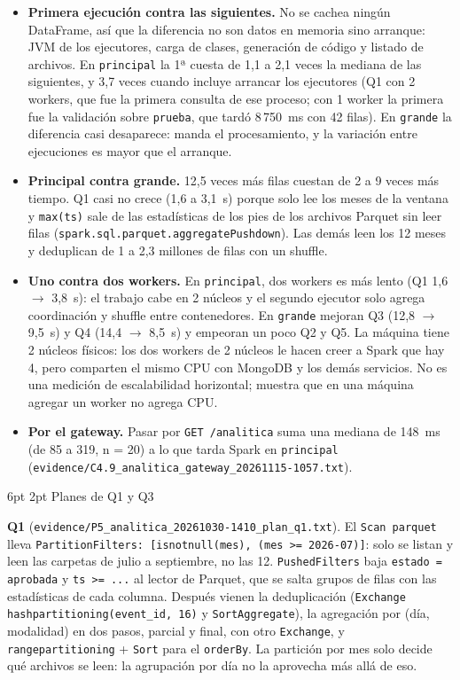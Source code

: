 \documentclass[10pt,letterpaper]{article}
\makeatletter
\newcommand{\ev}[1]{{\footnotesize\texttt{evidence/\allowbreak #1}}}
\renewcommand\subsection{\@startsection{subsection}{2}{\z@}%
  {6pt \@plus 1pt}{2pt}%
  {\normalfont\normalsize\bfseries\color{acc}}}
\makeatother
\begin{document}
\begin{itemize}\setlength{\itemsep}{1pt}
\item \textbf{Primera ejecución contra las siguientes.} No se cachea ningún DataFrame, así que la diferencia
no son datos en memoria sino arranque: JVM de los ejecutores, carga de clases, generación de código y listado
de archivos. En \texttt{principal} la 1ª cuesta de 1,1 a 2,1 veces la mediana de las siguientes, y 3,7 veces
cuando incluye arrancar los ejecutores (Q1 con 2 workers, que fue la primera consulta de ese proceso; con 1
worker la primera fue la validación sobre \texttt{prueba}, que tardó 8\,750~ms con 42 filas). En
\texttt{grande} la diferencia casi desaparece: manda el procesamiento, y la variación entre ejecuciones es
mayor que el arranque.
\item \textbf{Principal contra grande.} 12,5 veces más filas cuestan de 2 a 9 veces más tiempo. Q1 casi no
crece (1,6 a 3,1~s) porque solo lee los meses de la ventana y \texttt{max(ts)} sale de las estadísticas de
los pies de los archivos Parquet sin leer filas (\texttt{spark.sql.parquet.aggregatePushdown}). Las demás leen
los 12 meses y deduplican de 1 a 2,3 millones de filas con un shuffle.
\item \textbf{Uno contra dos workers.} En \texttt{principal}, dos workers es más lento (Q1 1,6 $\rightarrow$
3,8~s): el trabajo cabe en 2 núcleos y el segundo ejecutor solo agrega coordinación y shuffle entre
contenedores. En \texttt{grande} mejoran Q3 (12,8 $\rightarrow$ 9,5~s) y Q4 (14,4 $\rightarrow$ 8,5~s) y
empeoran un poco Q2 y Q5. La máquina tiene 2 núcleos físicos: los dos workers de 2 núcleos le hacen creer a
Spark que hay 4, pero comparten el mismo CPU con MongoDB y los demás servicios. No es una medición de
escalabilidad horizontal; muestra que en una máquina agregar un worker no agrega CPU.
\item \textbf{Por el gateway.} Pasar por \texttt{GET /analitica} suma una mediana de 148~ms (de 85 a 319,
n = 20) a lo que tarda Spark en \texttt{principal} (\ev{C4.9\_analitica\_gateway\_20261115-1057.txt}).
\end{itemize}

\subsection{Planes de Q1 y Q3}

\textbf{Q1} (\ev{P5\_analitica\_20261030-1410\_plan\_q1.txt}). El \texttt{Scan parquet} lleva
\texttt{PartitionFilters: [isnotnull(mes), (mes >= 2026-07)]}: solo se listan y leen las carpetas de julio a
septiembre, no las 12. \texttt{PushedFilters} baja \texttt{estado = aprobada} y \texttt{ts >= ...} al lector
de Parquet, que se salta grupos de filas con las estadísticas de cada columna. Después vienen la
deduplicación (\texttt{Exchange hashpartitioning(event\_id, 16)} y \texttt{SortAggregate}), la agregación por
(día, modalidad) en dos pasos, parcial y final, con otro \texttt{Exchange}, y \texttt{rangepartitioning} +
\texttt{Sort} para el \texttt{orderBy}. La partición por mes solo decide qué archivos se leen: la agrupación
por día no la aprovecha más allá de eso.
\end{document}
